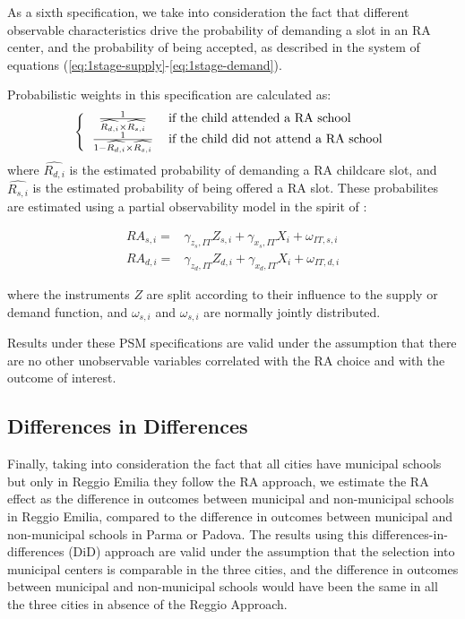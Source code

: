 \documentclass[12pt]{article}
\begin{document}
\medskip

As a sixth specification, we take into consideration the fact that different observable characteristics drive the probability of demanding a slot in an RA center, and the probability of being accepted, as described in the system of equations (\ref{eq:1stage-supply}-\ref{eq:1stage-demand}).

Probabilistic weights in this specification are calculated as:
%
\[
\left\{
\begin{tabular}{cl}
$\frac{1}{ \widehat{R_{d,i}} \times \widehat{R_{s,i}}}$   & if the child attended a RA school \\
$\frac{1}{1-\widehat{R_{d,i}}  \times \widehat{R_{s,i}}}$ & if the child did not attend a RA school
\end{tabular}
\right.
\]
%
where $\widehat{R_{d,i}}$ is the estimated probability of demanding a RA childcare slot, and $\widehat{R_{s,i}}$ is the estimated probability of being offered a RA slot. These probabilites are estimated using a partial observability model in the spirit of \cite{Poirier1980}:

\begin{align*}
RA_{s,i} = & \gamma_{z_{s},IT} Z_{s,i} + \gamma_{x_{s},IT} X_{i} + \omega_{IT,s,i} \\
RA_{d,i} = & \gamma_{z_{d},IT} Z_{d,i} + \gamma_{x_{d},IT} X_{i} + \omega_{IT,d,i} 
\end{align*}

where the instruments $Z$ are split according to their influence to the supply or demand function, and $\omega_{s,i}$ and $\omega_{s,i}$ are normally jointly distributed.

Results under these PSM specifications are valid under the assumption that there are no other unobservable variables correlated with the RA choice and with the outcome of interest.

\subsection{Differences in Differences}

Finally, taking into consideration the fact that all cities have municipal schools but only in Reggio Emilia they follow the RA approach, we estimate the RA effect as the difference in outcomes between municipal and non-municipal schools in Reggio Emilia, compared to the difference in outcomes between municipal and non-municipal schools in Parma or Padova. The results using this differences-in-differences (DiD) approach are valid under the assumption that the selection into municipal centers is comparable in the three cities, and the difference in outcomes between municipal and non-municipal schools would have been the same in all the three cities in absence of the Reggio Approach.
\end{document}
